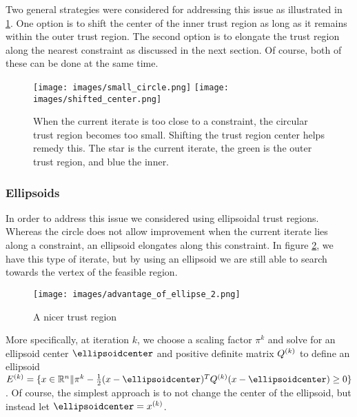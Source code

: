 Two general strategies were considered for addressing this issue as illustrated in \cref{options_basis}.
One option is to shift the center of the inner trust region as long as it remains within the outer trust region.
The second option is to elongate the trust region along the nearest constraint as discussed in the next section.
Of course, both of these can be done at the same time.


\begin{figure}[h]
    \centering
    \texttt{[image: images/small\_circle.png]}
    \texttt{[image: images/shifted\_center.png]}
    \caption{When the current iterate is too close to a constraint, the circular trust region becomes too small. Shifting the trust region center helps remedy this. The star is the current iterate, the green is the outer trust region, and blue the inner.}
    \label{options_basis}
\end{figure}

\subsubsection{Ellipsoids}

In order to address this issue we considered using ellipsoidal trust regions.
Whereas the circle does not allow improvement when the current iterate lies along a constraint, an ellipsoid elongates along this constraint.
In figure \cref{ellipse_adv}, we have this type of iterate, but by using an ellipsoid we are still able to search towards the vertex of the feasible region.
\begin{figure}[h]
    \centering
    \texttt{[image: images/advantage\_of\_ellipse\_2.png]}
    \caption{A nicer trust region}
    \label{ellipse_adv}
\end{figure}


More specifically, at iteration $k$, we choose a scaling factor $\pi^k$ and solve for an ellipsoid center $\ellipsoidcenter$ and positive definite matrix ${Q^{(k)}}$ to define an ellipsoid
$ \ellipsek = \{x \in \mathbb R^n \| \pi^k - \frac 1 2 (x - \ellipsoidcenter)^T\qk(x - \ellipsoidcenter) \ge 0 \}$.
Of course, the simplest approach is to not change the center of the ellipsoid, but instead let $\ellipsoidcenter = \xk$.


